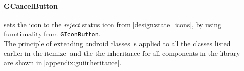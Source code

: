 \paragraph{GCancelButton} sets the icon to the \emph{reject} status icon from \autoref{design:state_icons}, by using functionality from \verb+GIconButton+. \\

\noindent The principle of extending android classes is applied to all the classes listed earlier in the itemize, and the the inheritance for all components in the library are shown in \autoref{appendix:guiinheritance}.

